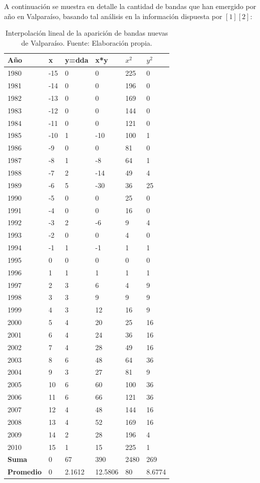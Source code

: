 A continuación se muestra en detalle la cantidad de bandas que han emergido por año en Valparaíso, basando tal análisis en la información dispuesta por $[1][2]$:

\begin{table}[h!]
\centering
\footnotesize
\begin{tabular}{|l|l|l|l|l|l|}
	\hline
	{\bf Año} & {\bf x} & {\bf y=dda} & {\bf x*y} & {\bf $x^2$ } & {\bf $y^2$ }\\
	\hline
	1980 &	-15	& 0	 & 0	& 225 &	0\\
	1981 &	-14	& 0	 & 0	& 196 &	0\\
	1982 &	-13	& 0	 & 0	& 169 &	0\\
	1983 &	-12	& 0	 & 0	& 144 &	0\\
	1984 &	-11	& 0	 & 0	& 121 &	0\\
	1985 &	-10	& 1	 & -10	& 100 &	1\\
	1986 &	-9	& 0	 & 0	& 81  &   0\\
	1987 &	-8	& 1	 & -8	& 64  &   1\\
	1988 &	-7	& 2	 & -14	& 49  &   4\\
	1989 &	-6	& 5	 & -30	& 36  &   25\\
	1990 &	-5	& 0	 & 0	& 25  &   0\\
	1991 &	-4	& 0	 & 0	& 16  &   0\\
	1992 &	-3	& 2	 & -6	& 9	  &   4\\
	1993 &	-2	& 0	 & 0	& 4	  &   0\\
	1994 &	-1	& 1	 & -1	& 1	  &   1\\
	1995 &	0	& 0	 & 0	& 0	  &   0\\
	1996 &	1	& 1	 & 1	& 1	  &   1\\
	1997 &	2	& 3	 & 6	& 4	  &   9\\
	1998 &	3	& 3	 & 9	& 9	  &   9\\
	1999 &	4	& 3	 & 12	& 16  &   9\\
	2000 &	5	& 4	 & 20	& 25  &   16\\
	2001 &	6	& 4	 & 24	& 36  &   16\\
	2002 &	7	& 4	 & 28	& 49  &   16\\
	2003 &	8	& 6	 & 48	& 64  &   36\\
	2004 &	9	& 3	 & 27	& 81  &   9\\
	2005 &	10	& 6	 & 60	& 100 &	36\\
	2006 &	11	& 6	 & 66	& 121 &	36\\
	2007 &	12	& 4	 & 48	& 144 &	16\\
	2008 &	13	& 4	 & 52	& 169 &	16\\
	2009 &	14	& 2	 & 28	& 196 &	4\\
	2010 &	15	& 1	 & 15	& 225 &	1\\
	\hline
	{\bf Suma}     & 0 & 67 & 390 & 2480 & 269\\
	\hline
	{\bf Promedio} & 0 & 2.1612 & 12.5806 & 80 & 8.6774\\
	\hline
\end{tabular}
\caption[Interpolación lineal de la aparición de bandas nuevas de Valparaíso]
{Interpolación lineal de la aparición de bandas nuevas de Valparaíso. Fuente:
Elaboración propia.}
\end{table}

